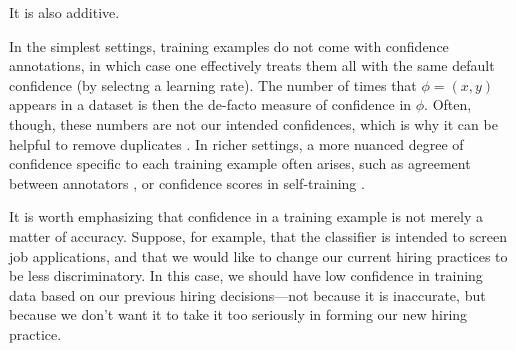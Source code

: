 \begin{example}
%
It is also additive.

In the simplest settings, 
training examples do not come with confidence annotations,
in which case one effectively treats them all with 
	the same default confidence (by selectng a learning rate).
The number of times that $\phi=(x,y)$ appears in a dataset
	is then the de-facto measure of confidence in $\phi$.
Often, though, these numbers are not our intended confidences,
	which is why it can be helpful to remove duplicates 
	\parencite{no-duplicates}.
In richer settings, a more nuanced degree of confidence 
    specific to each training example often arises, 
    such as agreement between annotators 
    \parencite{kappa},
    or
confidence scores in self-training \parencite{zou2019confidence}.

It is worth emphasizing that confidence
	in a training example is not merely a matter of accuracy.
Suppose, for example, that the classifier is intended to screen job applications, and that we would like to change our current hiring practices to be less discriminatory.
In this case, we should have low confidence in training data based on our previous hiring decisions---not because it is inaccurate, but because we don't want it to take it too seriously in forming our new hiring practice.
\end{example}




%




